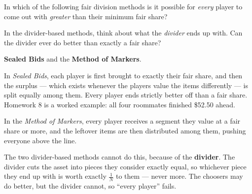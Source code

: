 \documentclass[12pt]{ximera}
\begin{document}
\begin{problem}
In which of the following fair division methods is it possible for \emph{every} player
to come out with \emph{greater} than their minimum fair share?

\begin{selectAll}
\end{selectAll}

\begin{hint}
In the divider-based methods, think about what the \emph{divider} ends up with. Can the
divider ever do better than exactly a fair share?
\end{hint}

\begin{feedback}
\textbf{Sealed Bids} and the \textbf{Method of Markers}.

In \emph{Sealed Bids}, each player is first brought to exactly their fair share, and
then the surplus --- which exists whenever the players value the items differently ---
is split equally among them. Every player ends strictly better off than a fair share.
Homework 8 is a worked example: all four roommates finished \$52.50 ahead.

In the \emph{Method of Markers}, every player receives a segment they value at a fair
share or more, and the leftover items are then distributed among them, pushing
everyone above the line.

The two divider-based methods cannot do this, because of the \textbf{divider}. The
divider cuts the asset into pieces they consider exactly equal, so whichever piece they
end up with is worth exactly $\frac1N$ to them --- never more. The choosers may do
better, but the divider cannot, so ``every player'' fails.
\end{feedback}
\end{problem}
\end{document}
